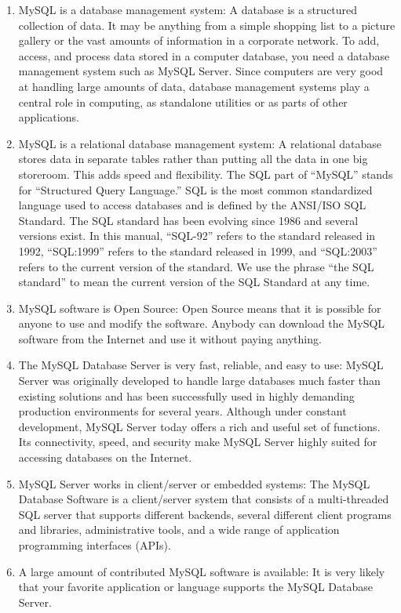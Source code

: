 \begin{enumerate}
\item MySQL is a database management system: A database is a structured collection of data. It may be anything from a simple shopping list to a picture gallery or the vast amounts of information in a corporate network. To add, access, and process data stored in a computer database, you need a database management system such as MySQL Server. Since computers are very good at handling large amounts of data, database management systems play a central role in computing, as standalone utilities or as parts of other applications.
\item MySQL is a relational database management system: A relational database stores data in separate tables rather than putting all the data in one big storeroom. This adds speed and flexibility. The SQL part of “MySQL” stands for “Structured Query Language.” SQL is the most common
standardized language used to access databases and is defined by the ANSI/ISO SQL Standard. The SQL standard has been evolving since 1986 and several versions exist. In this manual, “SQL-92” refers to the standard released in 1992, “SQL:1999” refers to the standard released in
1999, and “SQL:2003” refers to the current version of the standard. We use the phrase “the SQL standard” to mean the current version of the SQL Standard at any time.
\item MySQL software is Open Source: Open Source means that it is possible for anyone to use and modify the software. Anybody can download the MySQL software from the Internet and use it without paying anything.
\item The MySQL Database Server is very fast, reliable, and easy to use: MySQL Server was originally developed to handle large databases much faster than existing solutions and has been successfully used in highly demanding production environments for several years. Although under constant development, MySQL Server today offers a rich and useful set of functions. Its connectivity, speed, and security make MySQL Server highly suited for accessing databases on the Internet.
\item MySQL Server works in client/server or embedded systems: The MySQL Database Software is a client/server system that consists of a multi-threaded SQL server that supports different backends, several different client programs and libraries, administrative tools, and a wide range of application programming interfaces (APIs).
\item A large amount of contributed MySQL software is available: It is very likely that your favorite application or language supports the MySQL Database Server.
\end{enumerate}

